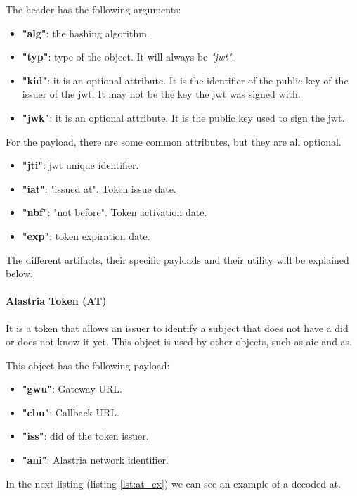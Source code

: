 \documentclass[a4paper, 12pt]{article} %
\begin{document}
            The header has the following arguments:
            \begin{itemize}
                \item \textbf{"alg"}: the hashing algorithm.
                \item \textbf{"typ"}: type of the object. It will always be \textit{"\acrshort{jwt}"}.
                \item \textbf{"kid"}: it is an optional attribute. It is the identifier of the public key of the issuer of the \acrshort{jwt}. It may not be the key the \acrshort{jwt} was signed with.
                \item \textbf{"jwk"}: it is an optional attribute. It is the public key used to sign the \acrshort{jwt}.
            \end{itemize}
            For the payload, there are some common attributes, but they are all optional.
            \begin{itemize}
                \item \textbf{"jti"}: \acrshort{jwt} unique identifier.
                \item \textbf{"iat"}: "issued at". Token issue date.
                \item \textbf{"nbf"}: "not before". Token activation date.
                \item \textbf{"exp"}: token expiration date.
            \end{itemize}
            The different artifacts, their specific payloads and their utility will be explained below.

            \paragraph{Alastria Token (AT)}
                It is a token that allows an issuer to identify a subject that does not have a \acrshort{did} or does not know it yet. This object is used by other objects, such as \acrfull{aic} and \acrfull{as}.
                
                This object has the following payload:
                \begin{itemize}
                    \item \textbf{"gwu"}: Gateway URL.
                    \item \textbf{"cbu"}: Callback URL.
                    \item \textbf{"iss"}: \acrshort{did} of the token issuer.
                    \item \textbf{"ani"}: Alastria network identifier.
                \end{itemize}
                In the next listing (listing \ref{lst:at_ex}) we can see an example of a decoded \acrlong{at}.
                
\end{document}

